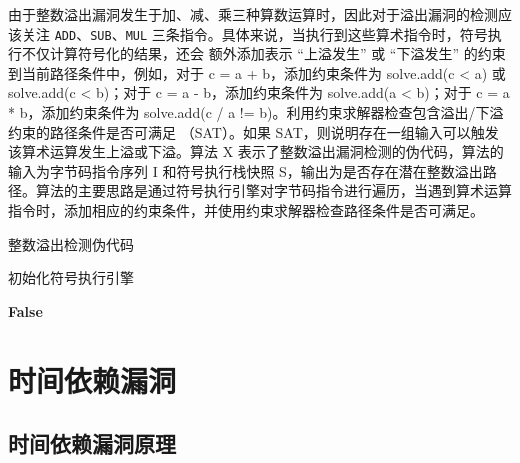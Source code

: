 \documentclass[print, master, vlined, timesmath]{DissertUESTC}
\begin{document}
由于整数溢出漏洞发生于加、减、乘三种算数运算时，因此对于溢出漏洞的检测应该关注 \texttt{ADD}、\texttt{SUB}、\texttt{MUL} 三条指令。具体来说，当执行到这些算术指令时，符号执行不仅计算符号化的结果，还会
额外添加表示 “上溢发生” 或 “下溢发生” 的约束到当前路径条件中，例如，对于 c = a + b，添加约束条件为 solve.add(c < a) 或 solve.add(c < b)；对于 c = a - b，添加约束条件为 solve.add(a < b)；对于 c = a * b，添加约束条件为 solve.add(c / a != b)。利用约束求解器检查包含溢出/下溢约束的路径条件是否可满足
（SAT）。如果 SAT，则说明存在一组输入可以触发该算术运算发生上溢或下溢。算法 X 表示了整数溢出漏洞检测的伪代码，算法的输入为字节码指令序列 I 和符号执行栈快照 S，输出为是否存在潜在整数溢出路径。算法的主要思路是通过符号执行引擎对字节码指令进行遍历，当遇到算术运算指令时，添加相应的约束条件，并使用约束求解器检查路径条件是否可满足。




\begin{algorithm}[H]
    \caption{整数溢出检测伪代码}
    
    初始化符号执行引擎\;
    
    
    \Return \textbf{False}
    \end{algorithm}
   
\section{时间依赖漏洞}
\subsection{时间依赖漏洞原理}
\end{document}
